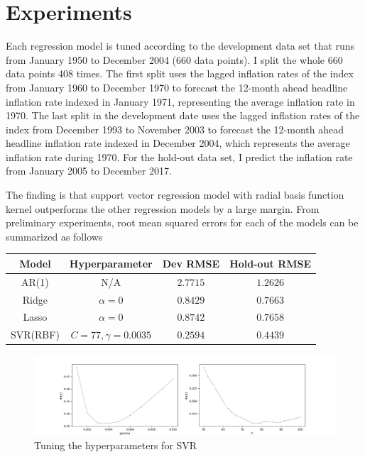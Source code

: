 \documentclass[10pt,twocolumn,letterpaper]{article}
\begin{document}
\section{Experiments}
Each regression model is tuned according to the development data set that runs from January 1950 to December 2004 (660 data points). I split the whole 660 data points 408 times. The first split uses the lagged inflation rates of the index from January 1960 to December 1970 to forecast the 12-month ahead headline inflation rate indexed in January 1971, representing the average inflation rate in 1970. The last split in the development date uses the lagged inflation rates of the index from December 1993 to November 2003 to forecast the 12-month ahead headline inflation rate indexed in December 2004, which represents the average inflation rate during 1970. For the hold-out data set, I predict the inflation rate from January 2005 to December 2017.

The finding is that support vector regression model with radial basis function kernel outperforms the other regression models by a large margin. From preliminary experiments, root mean squared errors for each of the models can be summarized as follows
\begin{center}
\footnotesize
\begin{tabular}{ |c|c|c|c| } 
 \hline
 Model & Hyperparameter & Dev RMSE & Hold-out RMSE \\ 
 \hline
 AR(1) & N/A & $2.7715$ & $1.2626$\\ 
Ridge & $\alpha = 0$ & $0.8429$ & $0.7663$ \\ 
Lasso & $\alpha = 0$ & $0.8742$ & $0.7658$ \\
SVR(RBF) & $C = 77, \gamma = 0.0035$& $0.2594$& $0.4439$\\
\hline
\end{tabular}
\end{center}

\begin{figure}[t]
\begin{center}
\includegraphics[scale=0.5]{../../Python/Tuning_SVR.png}
\caption{Tuning the hyperparameters for SVR}
\end{center}
\end{figure}
\end{document}
